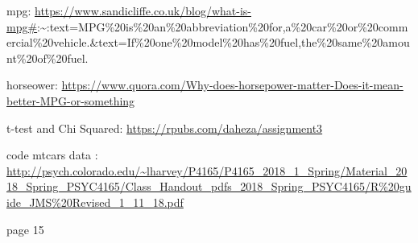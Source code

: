 \documentclass[]{book}
\begin{document}
mpg: \url{https://www.sandicliffe.co.uk/blog/what-is-mpg\#}:\textasciitilde{}:text=MPG\%20is\%20an\%20abbreviation\%20for,a\%20car\%20or\%20commercial\%20vehicle.\&text=If\%20one\%20model\%20has\%20fuel,the\%20same\%20amount\%20of\%20fuel.

horseower: \url{https://www.quora.com/Why-does-horsepower-matter-Does-it-mean-better-MPG-or-something}

t-test and Chi Squared: \url{https://rpubs.com/daheza/assignment3}

code mtcars data : \url{http://psych.colorado.edu/~lharvey/P4165/P4165_2018_1_Spring/Material_2018_Spring_PSYC4165/Class_Handout_pdfs_2018_Spring_PSYC4165/R\%20guide_JMS\%20Revised_1_11_18.pdf}

page 15


\end{document}
